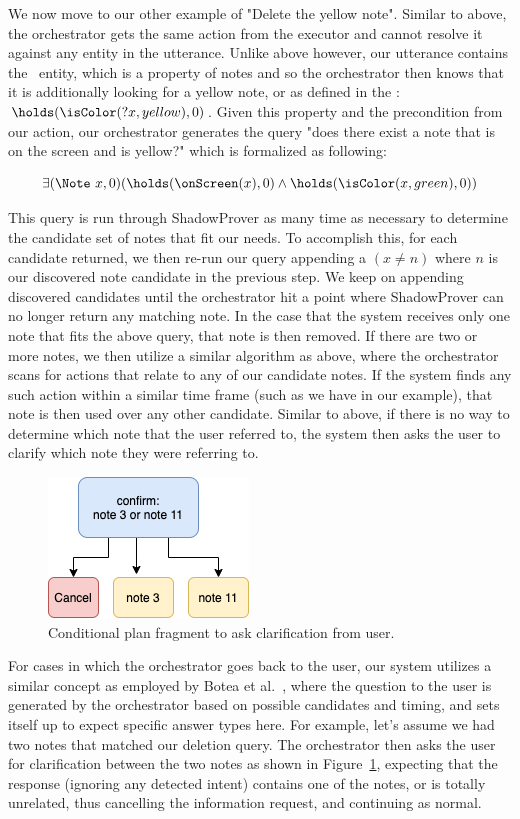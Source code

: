 We now move to our other example of "Delete the yellow note". Similar to above, the orchestrator
gets the same action from the executor and cannot resolve it against any entity in the utterance.
Unlike above however, our utterance contains the \Color\ entity, which is a property of notes and so the
orchestrator then knows that it is additionally looking for a yellow note, or as defined in the
\CEC: $\holds(\isColor(?x, yellow), 0)$. Given this property and the precondition from our action,
our orchestrator generates the query "does there exist a note that is on the screen and is
yellow?" which is formalized as following:

\begin{equation*}
    \exists (\Note\ x, 0) (\holds(\onScreen(x), 0) \land \holds(\isColor(x, green), 0))
\end{equation*}

This query is run through \textsf{ShadowProver} as many time as necessary to determine
the candidate set of notes that fit our needs. To accomplish this, for each candidate
returned, we then re-run our query appending a $(x \neq n)$ where $n$ is our discovered
note candidate in the previous step. We keep on appending discovered candidates until the orchestrator
hit a point where \textsf{ShadowProver} can no longer return any matching note. In the case
that the system receives only one note that fits the above query, that note is then removed.
If there are two or more notes, we then utilize a similar algorithm as above, where the
orchestrator scans for actions that relate to any of our candidate notes. If the system
finds any such action within a similar time frame (such as we have in our example), that note
is then used over any other candidate. Similar to above, if there is no way to determine
which note that the user referred to, the system then asks the user to clarify which
note they were referring to.

\begin{figure}
\centering
  \includegraphics[width=0.3\columnwidth]{chapters/06_planning/figures/intent_resolution_fragment.png}
  \caption{Conditional plan fragment to ask clarification from user.}
  \label{fig:intent_resolution_fragment}
\end{figure}

For cases in which the orchestrator goes back to the user, our system utilizes a similar concept
as employed by Botea et al.~\cite{botea_generating_2019}, where the question to the user
is generated by the orchestrator based on possible candidates and timing, and sets itself up
to expect specific answer types here. For example, let's assume we had two notes that matched
our deletion query. The orchestrator then asks the user for clarification between the two notes
as shown in Figure~\ref{fig:intent_resolution_fragment}, expecting that the response (ignoring
any detected intent) contains one of the notes, or is totally unrelated, thus cancelling the
information request, and continuing as normal. 
